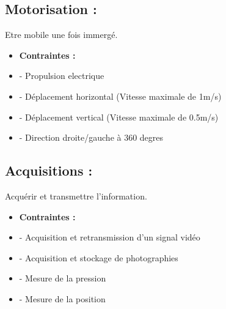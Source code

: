 \documentclass[a4paper,11pt]{report}
\begin{document}
\subsection{Motorisation :}
Etre mobile une fois immergé. \newline
\begin{itemize}
	\item \textbf{Contraintes :}
	\item - Propulsion electrique
	\item - Déplacement horizontal (Vitesse maximale de 1m/s)
	\item - Déplacement vertical (Vitesse maximale de 0.5m/s)
	\item - Direction droite/gauche à 360 degres   \newline \newline
\end{itemize}

\subsection{Acquisitions :}
Acquérir et transmettre l'information. \newline
\begin{itemize}
	\item \textbf{Contraintes :}
	\item - Acquisition et retransmission d'un signal vidéo
	\item - Acquisition et stockage de photographies
	\item - Mesure de la pression
	\item - Mesure de la position
\end{itemize}
\end{document}
